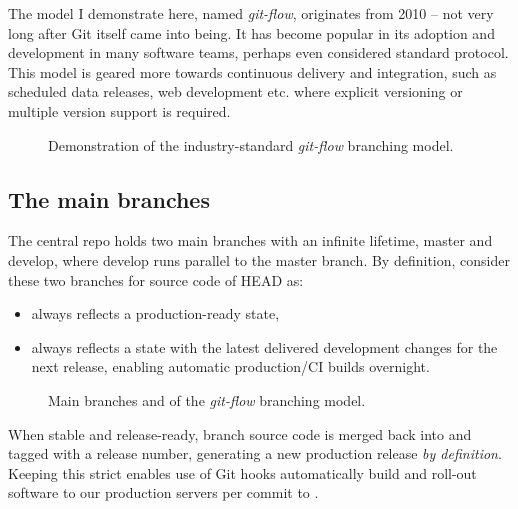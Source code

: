 The model I demonstrate here, named \emph{git-flow}, originates from 2010 -- not very long after Git itself came into being. It has become popular in its adoption and development in many software teams, perhaps even considered standard protocol. This model is geared more towards continuous delivery and integration, such as scheduled data releases, web development etc. where explicit versioning or multiple version support is required.

\vspace{11\baselineskip}%
\begin{figure}[H]
	\centering
	\noindent\resizebox{\textwidth}{!}{}
	\caption[A successful Git branching model]{Demonstration of the industry-standard \emph{git-flow} branching model.}
\end{figure}



\subsection{The main branches}

The central repo holds two main branches with an infinite lifetime, master and develop, where develop runs parallel to the master branch. By definition, consider these two branches for source code of HEAD as:

\begin{itemize}
	\item {} always reflects a production-ready state,
	\item {} always reflects a state with the latest delivered development changes for the next release, enabling automatic production/CI builds overnight.
\end{itemize}

\vspace{6\baselineskip}%
\begin{figure}[H]
	\centering
	\noindent\resizebox{.66\textwidth}{!}{}
	\caption[Main branches]{Main branches  and  of the \emph{git-flow} branching model.}
\end{figure}

When stable and release-ready,  branch source code is merged back into  and tagged with a release number, generating a new production release \emph{by definition}. Keeping this strict enables use of Git hooks automatically build and roll-out software to our production servers per commit to .




